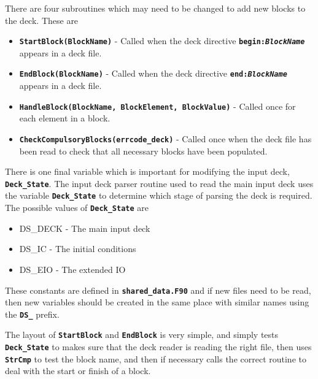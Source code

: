 \documentclass[12pt,a4paper]{article}
\newcommand{\inlinecode}[1]{{\color{warwickred} \bf\texttt{#1}}}
\begin{document}
There are four subroutines which may need to be changed to add new blocks to
the deck. These are
\begin{itemize}
\item \inlinecode{StartBlock(BlockName)} - Called when the deck directive
  \inlinecode{begin:{\it BlockName}} appears in a deck file.
\item \inlinecode{EndBlock(BlockName)} - Called when the deck directive
  \inlinecode{end:{\it BlockName}} appears in a deck file.
\item \inlinecode{HandleBlock(BlockName, BlockElement, BlockValue)} - Called once
  for each element in a block.
\item \inlinecode{CheckCompulsoryBlocks(errcode\_deck)} - Called once when the
  deck file has been read to check that all necessary blocks have been
  populated.
\end{itemize}

There is one final variable which is important for modifying the input deck,
\inlinecode{Deck\_State}. The input deck parser routine used to read the main
input deck uses the variable \inlinecode{Deck\_State} to
determine which stage of parsing the deck is required. The possible values of
\inlinecode{Deck\_State} are

\begin{itemize}
\item DS\_DECK - The main input deck
\item DS\_IC - The initial conditions
\item DS\_EIO - The extended IO
\end{itemize}
These constants are defined in \inlinecode{shared\_data.F90} and if new files
need to be read, then new variables should be created in the same place with
similar names using the \inlinecode{DS\_} prefix.

The layout of \inlinecode{StartBlock} and \inlinecode{EndBlock} is very simple,
and simply tests \inlinecode{Deck\_State} to makes sure that the deck reader is
reading the right file, then uses \inlinecode{StrCmp} to test the block name,
and then if necessary calls the correct routine to deal with the start or
finish of a block.
\end{document}
